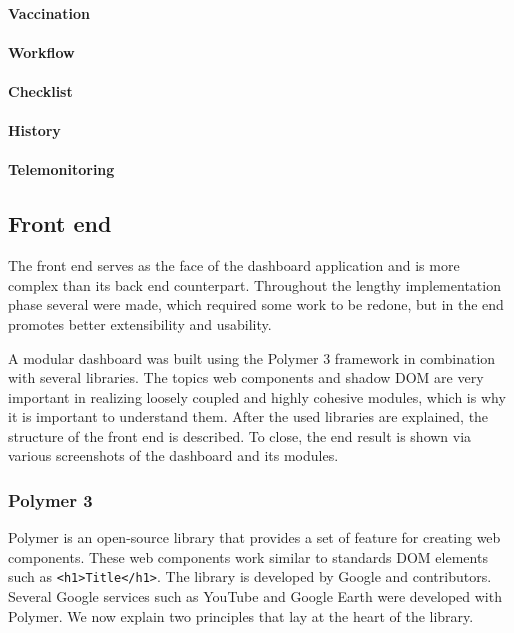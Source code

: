                 \paragraph{Vaccination}

                \paragraph{Workflow}

                \paragraph{Checklist}

                \paragraph{History}

                \paragraph{Telemonitoring}

    \subsection{Front end}

    The front end serves as the face of the dashboard application and is more complex than its back end counterpart. Throughout the lengthy implementation phase several were made, which required some work to be redone, but in the end promotes better extensibility and usability. 
    
    A modular dashboard was built using the Polymer 3 framework in combination with several libraries. The topics web components and shadow DOM are very important in realizing loosely coupled and highly cohesive modules, which is why it is important to understand them. After the used libraries are explained, the structure of the front end is described. To close, the end result is shown via various screenshots of the dashboard and its modules.

        \subsubsection{Polymer 3}

        Polymer is an open-source library that provides a set of feature for creating web components. These web components work similar to standards DOM elements such as \texttt{<h1>Title</h1>}. The library is developed by Google and contributors. Several Google services such as YouTube and Google Earth were developed with Polymer. We now explain two principles that lay at the heart of the library.

